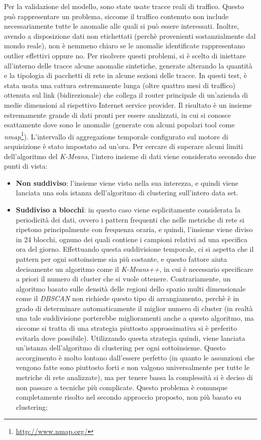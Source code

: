\documentclass[12pt,a4paper,cucitura]{toptesi}
\begin{document}
Per la validazione del modello, sono state usate tracce reali di traffico.
Questo può rappresentare un problema, siccome il traffico contenuto non include necessariamente tutte le anomalie alle quali si può essere interessati. 
Inoltre, avendo a disposizione dati non etichettati (perchè provenienti sostanzialmente dal mondo reale), non è nemmeno chiaro se le anomalie identificate rappresentano outlier effettivi oppure no.
Per risolvere questi problemi, si è scelto di iniettare all'interno delle tracce alcune anomalie sintetiche, generate alterando la quantità e la tipologia di pacchetti di rete in alcune sezioni delle tracce.
In questi test, è stata usata una cattura estremamente lunga (oltre quattro mesi di traffico) ottenuta sul link (bidirezionale) che collega il router principale di un'azienda di medie dimensioni al rispettivo Internet service provider.
Il risultato è un insieme estremamente grande di dati pronti per essere analizzati, in cui si conosce esattamente dove sono le anomalie (generate con alcuni popolari tool come \emph{nmap}\footnote{\url{http://www.nmap.org/}}).
L'intervallo di aggregazione temporale configurato sul motore di acquisizione è stato impostato ad un'ora.
Per cercare di superare alcuni limiti dell'algoritmo del \emph{K-Means}, l'intero insieme di dati viene considerato secondo due punti di vista:
\begin{itemize}
\item \textbf{Non suddiviso}: l'insieme viene visto nella sua interezza, e quindi viene lanciata una sola istanza dell'algoritmo di clustering sull'intero data set.
\item \textbf{Suddiviso a blocchi}: in questo caso viene esplicitamente considerata la periodicità dei dati, ovvero i pattern frequenti che nelle metriche di rete si ripetono principalmente con frequenza oraria, e quindi, l'insieme viene diviso in 24 blocchi, ognuno dei quali contiene i campioni relativi ad una specifica ora del giorno.
Effettuando questa suddivisione temporale, ci si aspetta che il pattern per ogni sottoinsieme sia più costante, e questo fattore aiuta decisamente un algoritmo come il \emph{K-Means++}, in cui è necessario specificare a priori il numero di cluster che si vuole ottenere.
Contrariamente, un algoritmo basato sulle densità delle regioni dello spazio multi dimensionale come il \emph{DBSCAN} non richiede questo tipo di arrangiamento, perchè è in grado di determinare automaticamente il miglior numero di cluster (in realtà una tale suddivisione porterebbe miglioramenti anche a questo algoritmo, ma siccome si tratta di una strategia piuttosto approssimativa si è preferito evitarla dove possibile).
Utilizzando questa strategia quindi, viene lanciata un'istanza dell'algoritmo di clustering per ogni sottoinsieme.
Questo accorgimento è molto lontano dall'essere perfetto (in quanto le assunzioni che vengono fatte sono piuttosto forti e non valgono universalmente per tutte le metriche di rete analizzate), ma per tenere bassa la complessità si è deciso di non passare a tecniche più complicate.
Questo problema è comunque completamente risolto nel secondo approccio proposto, non più basato su clustering;
\end{itemize}
\end{document}
